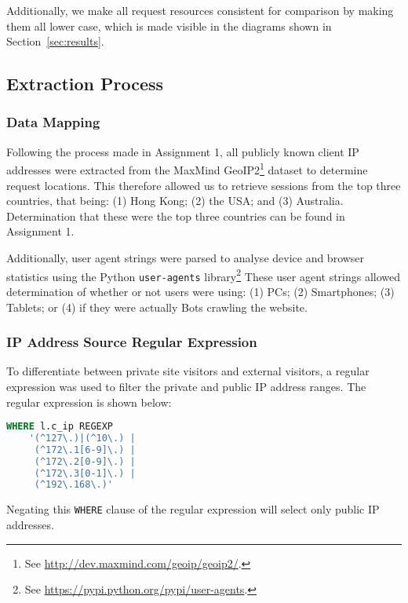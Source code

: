 Additionally, we make all request resources consistent for comparison by making them all lower case, which is made visible in the diagrams shown in Section~\ref{sec:results}.

\subsection{Extraction Process}
\label{sec:method:extraction_process}

\subsubsection{Data Mapping}
\label{sec:method:extraction_process:data_mapping}

Following the process made in Assignment 1, all publicly known client IP addresses were extracted from the MaxMind GeoIP2\footnote{See \url{http://dev.maxmind.com/geoip/geoip2/}.} dataset to determine request locations. This therefore allowed us to retrieve sessions from the top three countries, that being: (1) Hong Kong; (2) the USA; and (3) Australia. Determination that these were the top three countries can be found in Assignment 1.

Additionally, user agent strings were parsed to analyse device and browser statistics using the Python \texttt{user-agents} library\footnote{See \url{https://pypi.python.org/pypi/user-agents}.} These user agent strings allowed determination of whether or not users were using: (1) PCs; (2) Smartphones; (3) Tablets; or (4) if they were actually Bots crawling the website.

\subsubsection{IP Address Source Regular Expression}
\label{sec:method:extraction_process:ip_regex}

To differentiate between private site visitors and external visitors, a regular expression was used to filter the private and public IP address ranges. The regular expression is shown below:

\begin{lstlisting}[language=SQL, xleftmargin=2cm]
WHERE l.c_ip REGEXP 
	'(^127\.)|(^10\.) | 
	 (^172\.1[6-9]\.) |
	 (^172\.2[0-9]\.) |
	 (^172\.3[0-1]\.) |
	 (^192\.168\.)'
\end{lstlisting}

Negating this \texttt{WHERE} clause of the regular expression will select only public IP addresses.

